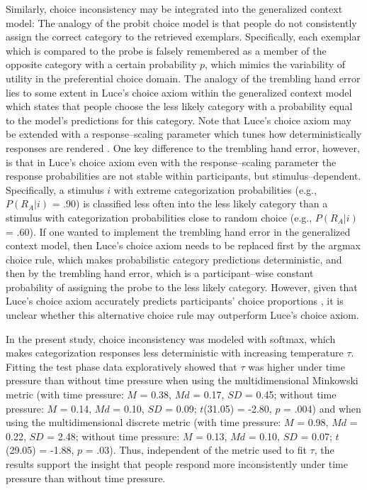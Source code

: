 \documentclass[a4paper,man,natbib]{apa6}
\begin{document}
Similarly, choice inconsistency may be integrated into the generalized context model: The analogy of the probit choice model is that people do not consistently assign the correct category to the retrieved exemplars. Specifically, each exemplar which is compared to the probe is falsely remembered as a member of the opposite category with a certain probability $p$, which mimics the variability of utility in the preferential choice domain. The analogy of the trembling hand error lies to some extent in Luce's choice axiom within the generalized context model which states that people choose the less likely category with a probability equal to the model's predictions for this category. Note that Luce's choice axiom may be extended with a response--scaling parameter which tunes how deterministically responses are rendered \citep{nosofsky2002exemplar, nosofsky2011generalized, ashby1993relations}. One key difference to the trembling hand error, however, is that in Luce's choice axiom even with the response--scaling parameter the response probabilities are not stable within participants, but stimulus--dependent. Specifically, a stimulus $i$ with extreme categorization probabilities (e.g., $P(R_{A}|i)$ = .90) is classified less often into the less likely category than a stimulus with categorization probabilities close to random choice (e.g., $P(R_{A}|i)$ = .60). If one wanted to implement the trembling hand error in the generalized context model, then Luce's choice axiom needs to be replaced first by the argmax choice rule, which makes probabilistic category predictions deterministic, and then by the trembling hand error, which is a participant--wise constant probability of assigning the probe to the less likely category. However, given that Luce's choice axiom accurately predicts participants' choice proportions \citep{nosofsky1987attention, mckinley1995investigations, lamberts2000information}, it is unclear whether this alternative choice rule may outperform Luce's choice axiom. 

In the present study, choice inconsistency was modeled with softmax, which makes categorization responses less deterministic with increasing temperature $\tau$. Fitting the test phase data exploratively showed that $\tau$ was higher under time pressure than without time pressure when using the multidimensional Minkowski metric (with time pressure: $M$ = 0.38, $Md$ = 0.17, $SD$ = 0.45; without time pressure: $M$ = 0.14, $Md$ = 0.10, $SD$ = 0.09; $t$(31.05) = -2.80, $p$ = .004) and when using the multidimensional discrete metric (with time pressure: $M$ = 0.98, $Md$ = 0.22, $SD$ = 2.48; without time pressure: $M$ = 0.13, $Md$ = 0.10, $SD$ = 0.07; $t$(29.05) = -1.88, $p$ = .03). Thus, independent of the metric used to fit $\tau$, the results support the insight that people respond more inconsistently under time pressure than without time pressure.
\end{document}
